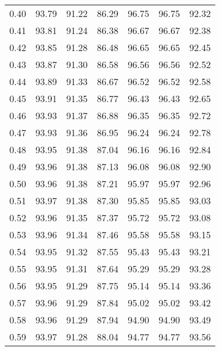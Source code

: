 \begin{tabular}{|c|c|c|c|c|c|c|}
      0.40 &     93.79 &     91.22 &      86.29 &   96.75 &      96.75 &         92.32 \\
      0.41 &     93.81 &     91.24 &      86.38 &   96.67 &      96.67 &         92.38 \\
      0.42 &     93.85 &     91.28 &      86.48 &   96.65 &      96.65 &         92.45 \\
      0.43 &     93.87 &     91.30 &      86.58 &   96.56 &      96.56 &         92.52 \\
      0.44 &     93.89 &     91.33 &      86.67 &   96.52 &      96.52 &         92.58 \\
      0.45 &     93.91 &     91.35 &      86.77 &   96.43 &      96.43 &         92.65 \\
      0.46 &     93.93 &     91.37 &      86.88 &   96.35 &      96.35 &         92.72 \\
      0.47 &     93.93 &     91.36 &      86.95 &   96.24 &      96.24 &         92.78 \\
      0.48 &     93.95 &     91.38 &      87.04 &   96.16 &      96.16 &         92.84 \\
      0.49 &     93.96 &     91.38 &      87.13 &   96.08 &      96.08 &         92.90 \\
      0.50 &     93.96 &     91.38 &      87.21 &   95.97 &      95.97 &         92.96 \\
      0.51 &     93.97 &     91.38 &      87.30 &   95.85 &      95.85 &         93.03 \\
      0.52 &     93.96 &     91.35 &      87.37 &   95.72 &      95.72 &         93.08 \\
      0.53 &     93.96 &     91.34 &      87.46 &   95.58 &      95.58 &         93.15 \\
      0.54 &     93.95 &     91.32 &      87.55 &   95.43 &      95.43 &         93.21 \\
      0.55 &     93.95 &     91.31 &      87.64 &   95.29 &      95.29 &         93.28 \\
      0.56 &     93.95 &     91.29 &      87.75 &   95.14 &      95.14 &         93.36 \\
      0.57 &     93.96 &     91.29 &      87.84 &   95.02 &      95.02 &         93.42 \\
      0.58 &     93.96 &     91.29 &      87.94 &   94.90 &      94.90 &         93.49 \\
      0.59 &     93.97 &     91.28 &      88.04 &   94.77 &      94.77 &         93.56 \\

\end{tabular}
